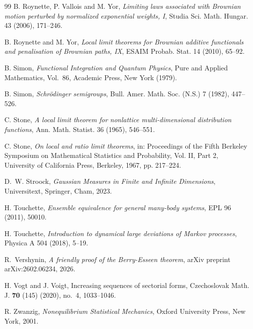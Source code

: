 \documentclass[11pt,reqno]{amsart}
\theoremstyle{definition}
\numberwithin{equation}{section}
\newcommand{\<}{\langle}
\renewcommand{\>}{\rangle}
\begin{document}
\begin{thebibliography}{99}
B. Roynette, P. Vallois and M. Yor,
\emph{Limiting laws associated with Brownian motion perturbed by normalized
exponential weights, I},
Studia Sci. Math. Hungar. 43 (2006), 171--246.

B. Roynette and M. Yor,
\emph{Local limit theorems for Brownian additive functionals and penalisation
of Brownian paths, IX},
ESAIM Probab. Stat. 14 (2010), 65--92.

B. Simon,
\emph{Functional Integration and Quantum Physics},
Pure and Applied Mathematics, Vol.~86,
Academic Press, New York (1979).


B. Simon,
\emph{Schr\"odinger semigroups},
Bull. Amer. Math. Soc. (N.S.) 7 (1982), 447--526.

C. Stone,
\emph{A local limit theorem for nonlattice multi-dimensional distribution
functions},
Ann. Math. Statist. 36 (1965), 546--551.

C. Stone,
\emph{On local and ratio limit theorems},
in: Proceedings of the Fifth Berkeley Symposium on Mathematical Statistics
and Probability, Vol. II, Part 2, University of California Press, Berkeley,
1967, pp. 217--224.

D.~W. Stroock,
\emph{Gaussian Measures in Finite and Infinite Dimensions},
Universitext, Springer, Cham, 2023.

H. Touchette,
\emph{Ensemble equivalence for general many-body systems},
EPL 96 (2011), 50010.

H. Touchette,
\emph{Introduction to dynamical large deviations of Markov processes},
Physica A 504 (2018), 5--19.

R.~Vershynin, \emph{A friendly proof of the Berry-Esseen theorem}, arXiv preprint arXiv:2602.06234, 2026.

H. Vogt and J. Voigt,
Increasing sequences of sectorial forms,
Czechoslovak Math. J. \textbf{70} (145) (2020), no.~4, 1033--1046.

R. Zwanzig,
\emph{Nonequilibrium Statistical Mechanics},
Oxford University Press, New York, 2001.

\end{thebibliography}
\end{document}
